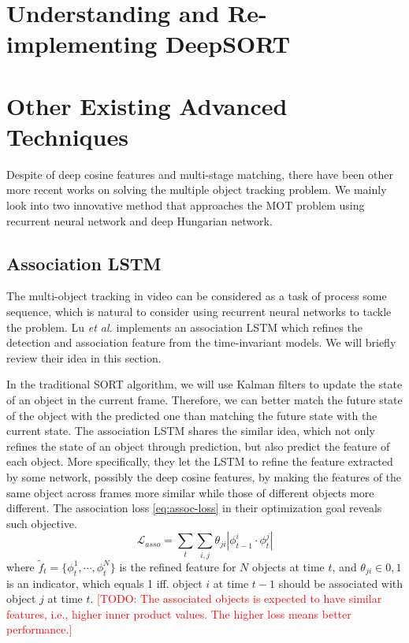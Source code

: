 \documentclass[conference]{IEEEtran}
\newcommand{\todo}[1]{\textcolor{red}{[TODO: #1]}}
\begin{document}

\section{Understanding and Re-implementing DeepSORT}

\section{Other Existing Advanced Techniques}
Despite of deep cosine features and multi-stage matching, there have been other more recent works on solving the multiple object tracking problem.
We mainly look into two innovative method that approaches the MOT problem using recurrent neural network and deep Hungarian network.

\subsection{Association LSTM}
The multi-object tracking in video can be considered as a task of process some sequence, which is natural to consider using recurrent neural networks to tackle the problem.
Lu \textit{et al.} \cite{lu2017online} implements an association LSTM which refines the detection and association feature from the time-invariant models.
We will briefly review their idea in this section.

In the traditional SORT algorithm, we will use Kalman filters to update the state of an object in the current frame.
Therefore, we can better match the future state of the object with the predicted one than matching the future state with the current state.
The association LSTM shares the similar idea, which not only refines the state of an object through prediction, but also predict the feature of each object.
More specifically, they let the LSTM to refine the feature extracted by some network, possibly the deep cosine features, by making the features of the same object across frames more similar while those of different objects more different.
The association loss \eqref{eq:assoc-loss} in their optimization goal reveals such objective.
\begin{equation}
    \mathcal{L}_{asso} = \sum_t \sum_{i,j} \theta_{ji}|\phi_{t-1}^i \cdot \phi_t^j|
    \label{eq:assoc-loss}
\end{equation}
where $\tilde{f}_t = \{\phi_t^1, \cdots, \phi_t^N\}$ is the refined feature for $N$ objects at time $t$, and $\theta_{ji} \in 0, 1$ is an indicator, which equals 1 iff. object $i$ at time $t-1$ should be associated with object $j$ at time $t$.
\todo{The associated objects is expected to have similar features, i.e., higher inner product values.
The higher loss means better performance.}
\end{document}
